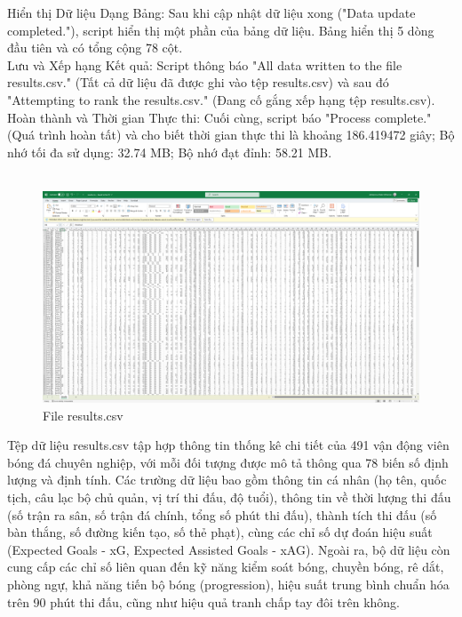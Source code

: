 \documentclass[12pt]{report}
\begin{document}
{Hiển thị Dữ liệu Dạng Bảng: Sau khi cập nhật dữ liệu xong ("Data update completed."), script hiển thị một phần của bảng dữ liệu. Bảng hiển thị 5 dòng đầu tiên và có tổng cộng 78 cột.\\
Lưu và Xếp hạng Kết quả: Script thông báo "All data written to the file results.csv." (Tất cả dữ liệu đã được ghi vào tệp results.csv) và sau đó "Attempting to rank the results.csv." (Đang cố gắng xếp hạng tệp results.csv).\\
Hoàn thành và Thời gian Thực thi: Cuối cùng, script báo "Process complete." (Quá trình hoàn tất) và cho biết thời gian thực thi là khoảng 186.419472 giây; Bộ nhớ tối đa sử dụng: 32.74 MB; Bộ nhớ đạt đỉnh: 58.21 MB.\\\\
\begin{figure}[h]
    \centering
    \includegraphics[width=\textwidth]{results_csv.png}
    \caption{File results.csv}
    \label{fig:terminal}
\end{figure}
Tệp dữ liệu results.csv tập hợp thông tin thống kê chi tiết của 491 vận động viên bóng đá chuyên nghiệp, với mỗi đối tượng được mô tả thông qua 78 biến số định lượng và định tính. Các trường dữ liệu bao gồm thông tin cá nhân (họ tên, quốc tịch, câu lạc bộ chủ quản, vị trí thi đấu, độ tuổi), thông tin về thời lượng thi đấu (số trận ra sân, số trận đá chính, tổng số phút thi đấu), thành tích thi đấu (số bàn thắng, số đường kiến tạo, số thẻ phạt), cùng các chỉ số dự đoán hiệu suất (Expected Goals - xG, Expected Assisted Goals - xAG). Ngoài ra, bộ dữ liệu còn cung cấp các chỉ số liên quan đến kỹ năng kiểm soát bóng, chuyền bóng, rê dắt, phòng ngự, khả năng tiến bộ bóng (progression), hiệu suất trung bình chuẩn hóa trên 90 phút thi đấu, cũng như hiệu quả tranh chấp tay đôi trên không.
}
\end{document}
